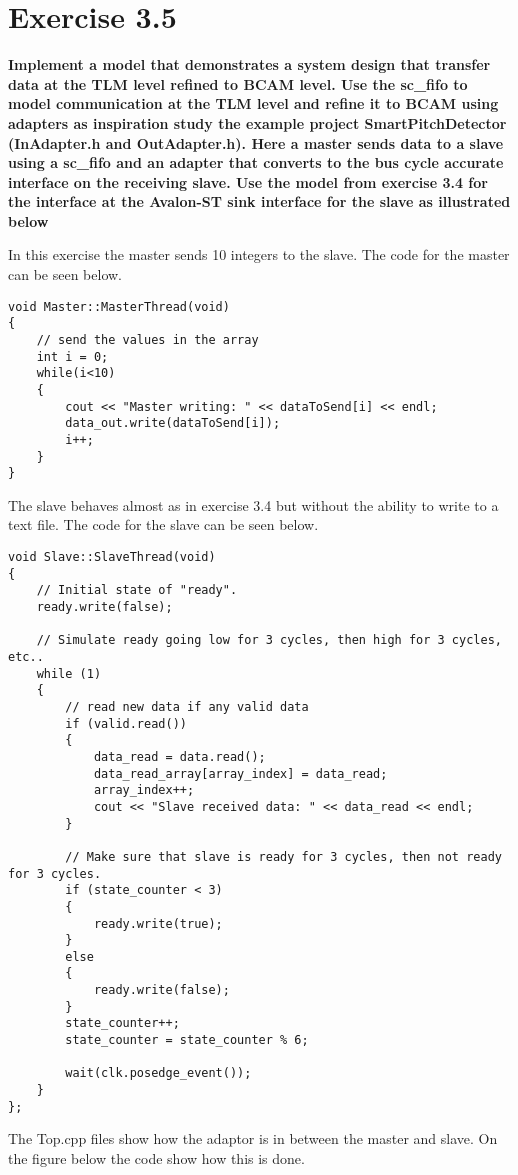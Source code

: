
\chapter{Exercise 3.5}
\textbf{Implement a model that demonstrates a system design that transfer data at the TLM level
refined to BCAM level. Use the sc\_fifo to model communication at the TLM level and refine it to
BCAM using adapters as inspiration study the example project SmartPitchDetector (InAdapter.h
and OutAdapter.h). Here a master sends data to a slave using a sc\_fifo and an adapter that
converts to the bus cycle accurate interface on the receiving slave. Use the model from exercise
3.4 for the interface at the Avalon-ST sink interface for the slave as illustrated below}


In this exercise the master sends 10 integers to the slave. The code for the master can be seen below.
\begin{lstlisting}
void Master::MasterThread(void)
{
	// send the values in the array
	int i = 0;
	while(i<10)
	{
		cout << "Master writing: " << dataToSend[i] << endl;
		data_out.write(dataToSend[i]);
		i++;
	}
}
\end{lstlisting}

The slave behaves almost as in exercise 3.4 but without the ability to write to a text file. The code for the slave can be seen below.

\begin{lstlisting}
void Slave::SlaveThread(void)
{
	// Initial state of "ready".
	ready.write(false);
	
	// Simulate ready going low for 3 cycles, then high for 3 cycles, etc..
	while (1)
	{
		// read new data if any valid data
		if (valid.read())
		{
			data_read = data.read();
			data_read_array[array_index] = data_read;
			array_index++;
			cout << "Slave received data: " << data_read << endl;
		}
		
		// Make sure that slave is ready for 3 cycles, then not ready for 3 cycles.
		if (state_counter < 3)
		{
			ready.write(true);
		}
		else
		{
			ready.write(false);
		}
		state_counter++;
		state_counter = state_counter % 6;
		
		wait(clk.posedge_event());
	}
};
\end{lstlisting}


The Top.cpp files show how the adaptor is in between the master and slave. On the figure below the code show how this is done.


